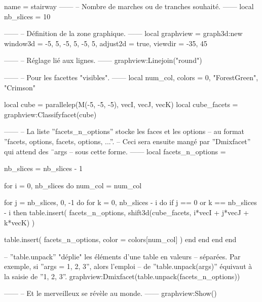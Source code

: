 \documentclass[border = 3pt]{standalone}
\begin{document}
\begin{luadraw}{name = stairway}
------
-- Nombre de marches ou de tranches souhaité.
------
local nb_slices = 10

------
-- Définition de la zone graphique.
------
local graphview = graph3d:new{
  window3d = {-5, 5, -5, 5, -5, 5},
  adjust2d = true,
  viewdir  = {-35, 45}
}

------
-- Réglage lié aux lignes.
------
graphview:Linejoin("round")

------
-- Pour les facettes "visibles".
------
local num_col, colors = 0, {"ForestGreen", "Crimson"}

local cube        = parallelep(M(-5, -5, -5), vecI, vecJ, vecK)
local cube_facets = graphview:Classifyfacet(cube)

------
-- La liste ''facets_n_options'' stocke les faces et les options
-- au format ''{facets, options, facets, options, ...}''.
-- Ceci sera ensuite mangé par ''Dmixfacet'' qui attend des ¨args
-- sous cette forme.
------
local facets_n_options = {}

nb_slices = nb_slices - 1

for i = 0, nb_slices do
  num_col = num_col%

  for j = nb_slices, 0, -1 do
    for k = 0, nb_slices - i do
      if j == 0 or k == nb_slices - i then
        table.insert(
          facets_n_options,
          shift3d(cube_facets, i*vecI + j*vecJ + k*vecK)
        )

        table.insert(
          facets_n_options,
          {
            color = colors[num_col]
          })
      end
    end
  end
end

-- ''table.unpack'' "déplie" les éléments d'une table en valeurs
-- séparées. Par exemple, si ''args = {1, 2, 3}'', alors l'emploi
-- de ''table.unpack(args)'' équivaut à la saisie de ''1, 2, 3''.
graphview:Dmixfacet(table.unpack(facets_n_options))

------
-- Et le merveilleux se révèle au monde.
------
graphview:Show()
\end{luadraw}
\end{document}
